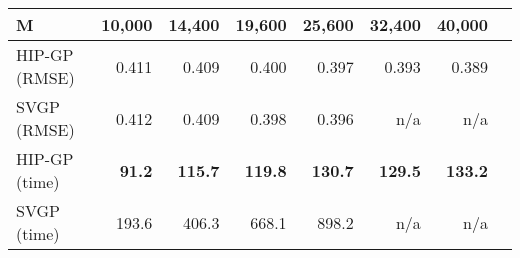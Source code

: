 \begin{tabular}{lrrrrrrr}
    \toprule
    M & 10{,}000 & 14{,}400 & 19{,}600 &  25{,}600 & 32{,}400 & 40{,}000 \\
    \midrule
    HIP-GP (RMSE)& 0.411 & 0.409 & 0.400 &0.397 &0.393 & 0.389 \\
    SVGP (RMSE) & 0.412 & 0.409 & 0.398 &0.396 & n/a & n/a \\
    \midrule
    HIP-GP (time)     &\textbf{91.2}  &\textbf{115.7} &\textbf{119.8} &\textbf{130.7} &\textbf{129.5} &\textbf{133.2} \\
    SVGP (time)   &193.6          &406.3 &668.1 &898.2 &n/a &n/a\\
    \bottomrule %
    \end{tabular}